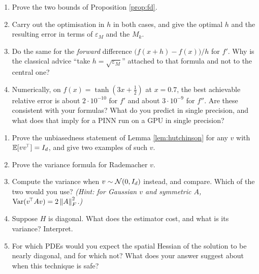 \documentclass[11pt,a4paper]{article}
\begin{document}
\begin{exercise}\label{ex:fd}
\leavevmode
\begin{enumerate}[label=\textbf{\arabic*.}]
\item Prove the two bounds of Proposition \ref{prop:fd}.
\item Carry out the optimisation in $h$ in both cases, and give the optimal $h$ and the resulting
error in terms of $\varepsilon_{\!M}$ and the $M_k$.
\item Do the same for the \emph{forward} difference $\big(f(x+h)-f(x)\big)/h$ for $f'$. Why is the
classical advice ``take $h = \sqrt{\varepsilon_{\!M}}$'' attached to that formula and not to the
central one?
\item Numerically, on $f(x) = \tanh(3x+\tfrac12)$ at $x = 0.7$, the best achievable relative error is
about $2\cdot 10^{-10}$ for $f'$ and about $3\cdot 10^{-9}$ for $f''$. Are these consistent with
your formulas? What do you predict in single precision, and what does that imply for a PINN run on a
GPU in single precision?
\end{enumerate}
\end{exercise}

\begin{exercise}\label{ex:hutch}
\leavevmode
\begin{enumerate}[label=\textbf{\arabic*.}]
\item Prove the unbiasedness statement of Lemma \ref{lem:hutchinson} for any $v$ with
$\mathbb{E}[vv^{\!\top}] = I_d$, and give two examples of such $v$.
\item Prove the variance formula for Rademacher $v$.
\item Compute the variance when $v \sim \mathcal{N}(0,I_d)$ instead, and compare. Which of the two would you
use? \emph{(Hint: for Gaussian $v$ and symmetric $A$, $\operatorname{Var}(v^{\!\top}Av) = 2\left\lVert A \right\rVert_F^2$.)}
\item Suppose $H$ is diagonal. What does the estimator cost, and what is its variance? Interpret.
\item For which PDEs would you expect the spatial Hessian of the solution to be nearly diagonal, and
for which not? What does your answer suggest about when this technique is safe?
\end{enumerate}
\end{exercise}
\end{document}
